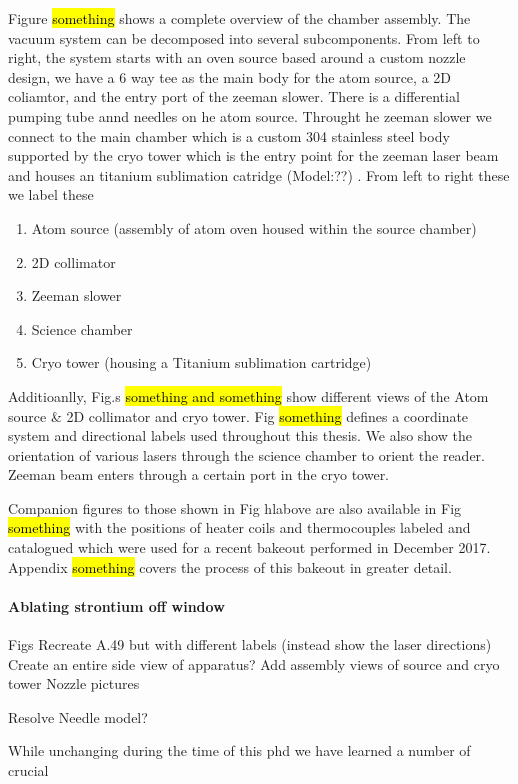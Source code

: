Figure \hl{something} shows a complete overview of the chamber assembly. 
The vacuum system can be decomposed into several subcomponents. 
From left to right, the system starts with an oven source based around a custom nozzle design, we have a 6 way tee as the main body for the atom source, a 2D coliamtor, and the entry port of the zeeman slower.
There is a differential pumping tube annd needles on he atom source. Throught he zeeman slower we connect to the main chamber which is a custom 304 stainless steel body supported by the cryo tower which is the entry point for the zeeman laser beam and houses an titanium sublimation catridge (Model:??) .
From left to right these we label these
\begin{enumerate}
\item Atom source (assembly of atom oven housed within the source chamber)
\item 2D collimator
\item Zeeman slower
\item Science chamber
\item Cryo tower (housing a Titanium sublimation cartridge)
\end{enumerate}

Additioanlly, Fig.s \hl{something and something} show different views of the Atom source \& 2D collimator and cryo tower. 
Fig \hl{something} defines a coordinate system and directional labels used throughout this thesis. We also show the orientation of various lasers through the science chamber to orient the reader.
Zeeman beam enters through a certain port in the cryo tower.

Companion figures to those shown in Fig hl{above} are also available in Fig \hl{something} with the positions of heater coils and thermocouples labeled and catalogued which were used for a recent bakeout performed in December 2017. 
Appendix \hl{something} covers the process of this bakeout in greater detail.

\paragraph{Ablating strontium off window}




Figs
	Recreate A.49 but with different labels (instead show the laser directions)
	Create an entire side view of apparatus?
	Add assembly views of source and cryo tower
	Nozzle pictures
	
Resolve
	Needle model?


While unchanging during the time of this phd we have learned a number of crucial 

